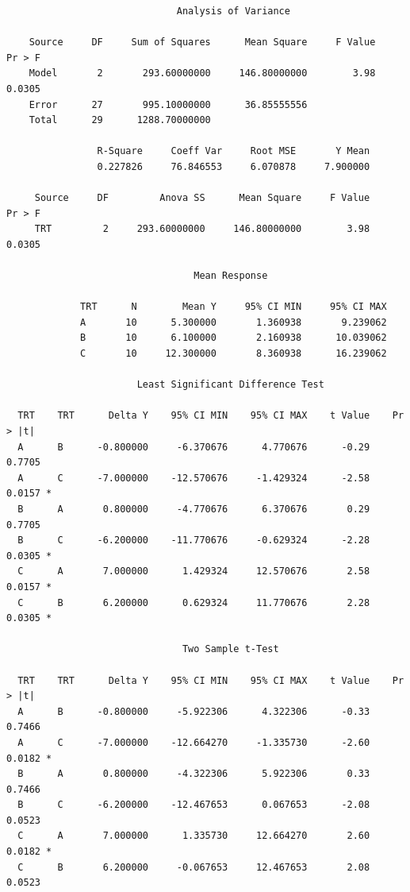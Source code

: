 \documentclass[12pt]{article}
\begin{document}
{\footnotesize\begin{verbatim}
                              Analysis of Variance

    Source     DF     Sum of Squares      Mean Square     F Value     Pr > F
    Model       2       293.60000000     146.80000000        3.98     0.0305
    Error      27       995.10000000      36.85555556                       
    Total      29      1288.70000000                                        

                R-Square     Coeff Var     Root MSE       Y Mean
                0.227826     76.846553     6.070878     7.900000

     Source     DF         Anova SS      Mean Square     F Value     Pr > F
     TRT         2     293.60000000     146.80000000        3.98     0.0305

                                 Mean Response

             TRT      N        Mean Y     95% CI MIN     95% CI MAX
             A       10      5.300000       1.360938       9.239062
             B       10      6.100000       2.160938      10.039062
             C       10     12.300000       8.360938      16.239062

                       Least Significant Difference Test

  TRT    TRT      Delta Y    95% CI MIN    95% CI MAX    t Value    Pr > |t|  
  A      B      -0.800000     -6.370676      4.770676      -0.29      0.7705  
  A      C      -7.000000    -12.570676     -1.429324      -2.58      0.0157 *
  B      A       0.800000     -4.770676      6.370676       0.29      0.7705  
  B      C      -6.200000    -11.770676     -0.629324      -2.28      0.0305 *
  C      A       7.000000      1.429324     12.570676       2.58      0.0157 *
  C      B       6.200000      0.629324     11.770676       2.28      0.0305 *

                               Two Sample t-Test

  TRT    TRT      Delta Y    95% CI MIN    95% CI MAX    t Value    Pr > |t|  
  A      B      -0.800000     -5.922306      4.322306      -0.33      0.7466  
  A      C      -7.000000    -12.664270     -1.335730      -2.60      0.0182 *
  B      A       0.800000     -4.322306      5.922306       0.33      0.7466  
  B      C      -6.200000    -12.467653      0.067653      -2.08      0.0523  
  C      A       7.000000      1.335730     12.664270       2.60      0.0182 *
  C      B       6.200000     -0.067653     12.467653       2.08      0.0523  
\end{verbatim}}
\end{document}
